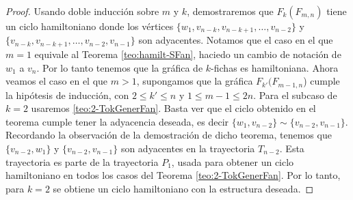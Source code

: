     \begin{proof}
        Usando doble inducci\'on sobre $m$ y $k$, demostraremos que
        $F_k(F_{m,n})$ tiene un ciclo hamiltoniano donde los v\'ertices $\{w_1,
        v_{n-k}, v_{n-k+1}, \dots, v_{n-2}\}$ y $\{v_{n-k}, v_{n-k+1}, \dots,
        v_{n-2}, v_{n-1}\}$ son adyacentes. Notamos que el caso en el que $m =1$
        equivale al Teorema \ref{teo:hamilt-SFan}, haciedo un cambio de
        notaci\'on de $w_1$ a $v_n$. Por lo tanto tenemos que la gr\'afica de
        $k$-fichas es hamiltoniana. Ahora veamos el caso en el que $m>1$,
        supongamos que la gr\'afica $F_{k'}(F_{m-1,n}$) cumple la hip\'otesis de
        inducci\'on, con $2\leq k'\leq n$ y $1 \leq m-1 \leq 2n$. Para el subcaso de
        $k=2$ usaremos \cref{teo:2-TokGenerFan}. Basta ver que el ciclo
        obtenido en el teorema cumple tener la adyacencia deseada, es decir
        $\{w_1, v_{n-2}\}\sim\{v_{n-2}, v_{n-1}\}$. Recordando la observaci\'on
        de la demostraci\'on de dicho teorema, tenemos que $\{v_{n-2},w_1\}$ y
        $\{v_{n-2},v_{n-1}\}$ son adyacentes en la trayectoria $T_{n-2}$. Esta
        trayectoria es parte de la trayectoria $P_1$, usada para obtener un
        ciclo hamiltoniano en todos los casos del Teorema
        \ref{teo:2-TokGenerFan}. Por lo tanto, para $k=2$ se obtiene un ciclo
        hamiltoniano con la estructura deseada.


\end{proof}
